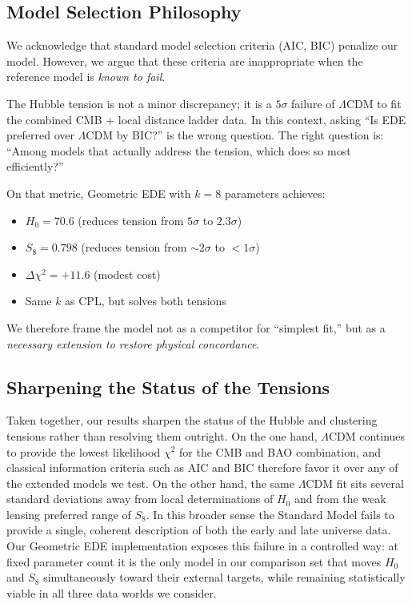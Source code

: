 \subsection{Model Selection Philosophy}

We acknowledge that standard model selection criteria (AIC, BIC) penalize our model. However, we argue that these criteria are inappropriate when the reference model is \emph{known to fail}.

The Hubble tension is not a minor discrepancy; it is a $5\sigma$ failure of $\Lambda$CDM to fit the combined CMB + local distance ladder data. In this context, asking ``Is EDE preferred over $\Lambda$CDM by BIC?'' is the wrong question. The right question is: ``Among models that actually address the tension, which does so most efficiently?''

On that metric, Geometric EDE with $k = 8$ parameters achieves:
\begin{itemize}
    \item $H_0 = 70.6$ (reduces tension from $5\sigma$ to $2.3\sigma$)
    \item $S_8 = 0.798$ (reduces tension from $\sim 2\sigma$ to $< 1\sigma$)
    \item $\Delta\chi^2 = +11.6$ (modest cost)
    \item Same $k$ as CPL, but solves both tensions
\end{itemize}

We therefore frame the model not as a competitor for ``simplest fit,'' but as a \emph{necessary extension to restore physical concordance}.

\subsection{Sharpening the Status of the Tensions}

Taken together, our results sharpen the status of the Hubble and clustering tensions rather than resolving them outright. On the one hand, $\Lambda$CDM continues to provide the lowest likelihood $\chi^2$ for the CMB and BAO combination, and classical information criteria such as AIC and BIC therefore favor it over any of the extended models we test. On the other hand, the same $\Lambda$CDM fit sits several standard deviations away from local determinations of $H_0$ and from the weak lensing preferred range of $S_8$. In this broader sense the Standard Model fails to provide a single, coherent description of both the early and late universe data. Our Geometric EDE implementation exposes this failure in a controlled way: at fixed parameter count it is the only model in our comparison set that moves $H_0$ and $S_8$ simultaneously toward their external targets, while remaining statistically viable in all three data worlds we consider.

